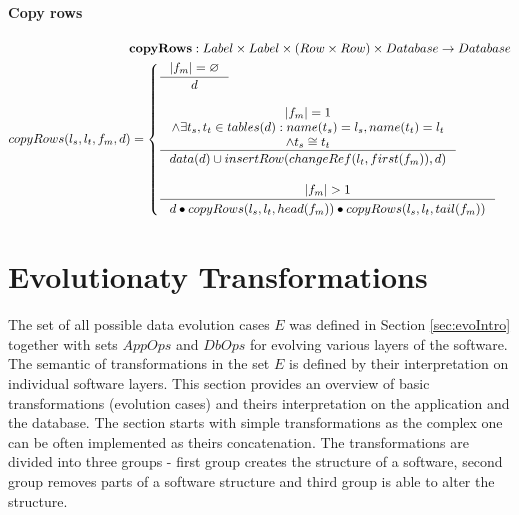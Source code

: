 \documentclass[11pt]{article}
\begin{document}
\paragraph{Copy rows}
\begin{align*}
	\mathbf{copyRows} : Label \times Label \times (Row \times Row) \times Database \rightarrow Database \\
	copyRows(l_s, l_t, f_m, d) = \begin{cases}
 	\inference{|f_m| = \varnothing}{d} \\\\
 	\inference{|f_m| = 1 \\ \wedge \exists t_s, t_t \in tables(d) : name(t_s) = l_s, name(t_t) = l_t \\ \wedge t_s \cong t_t }{data(d) \cup insertRow(changeRef(l_t, first(f_m)), d)} \\\\
 	\inference{|f_m| > 1}{\begin{gathered}
		 d \bullet copyRows(l_s, l_t, head(f_m)) \bullet copyRows(l_s, l_t, tail(f_m))
	\end{gathered}}
  \end{cases}
\end{align*}






\section{Evolutionaty Transformations}
The set of all possible data evolution cases $E$ was defined in Section \ref{sec:evoIntro} together with sets $AppOps$ and $DbOps$ for evolving various layers of the software. The semantic of transformations in the set $E$ is defined by their interpretation on individual software layers. This section provides an overview of basic transformations (evolution cases) and theirs interpretation on the application and the database. The section starts with simple transformations as the complex one can be often implemented as theirs concatenation. The transformations are divided into three groups - first group creates the structure of a software, second group removes parts of a software structure and third group is able to alter the structure.
\end{document}
